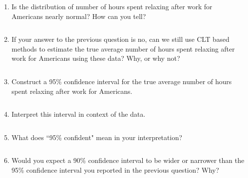 \documentclass[12pt]{article}
\newcommand{\soln}[2]{$\:$\\ \vspace{#1}}{}
\begin{document}
\begin{enumerate}

\item Is the distribution of number of hours spent relaxing after work for Americans nearly normal? 
How can you tell?

\soln{2cm}{Right skewed since the mean is too close to the natural boundary at 0 for how large the standard
deviation is.}

\item If your answer to the previous question is no, can we still use CLT based methods to estimate 
the true average number of hours spent relaxing after work for Americans using these data? Why, 
or why not?

\soln{4cm}{Yes, because the following conditions check out:
\begin{itemize}
\item Independence: Since the sample is random and less than 10\% of the population, we can assume that
the sampled individuals are independent of each other with respect to how much they relax after work.
\item Sample size / skew: While the distribution of the sample (and hence the population) is right skewed,
we have a large enough sample for the sampling distribution of the sample mean to be nearly normal.
\end{itemize}
}

\pagebreak

\item Construct a 95\% confidence interval for the true average number of hours spent relaxing after 
work for Americans.

\soln{3.5cm}{
\[ 
3.68 \pm 1.96 \times \frac{2.6}{\sqrt{1,154}} = 3.68 \pm 0.15 = (3.53,~3.83)
\]
}

\item Interpret this interval in context of the data.

\soln{3cm}{We are 95\% confident that Americans relax on average 3.53 to 3.83 hours after work.}

\item What does ``95\% confident" mean in your interpretation?

\soln{3cm}{95\% of random samples of size 1,154 from this population will yield confidence intervals
that contain the true population mean of number of hours Americans spend relaxing after work.}

\item Would you expect a 90\% confidence interval to be wider or narrower than the 95\% confidence 
interval you reported in the previous question? Why?


\end{enumerate}
\end{document}
